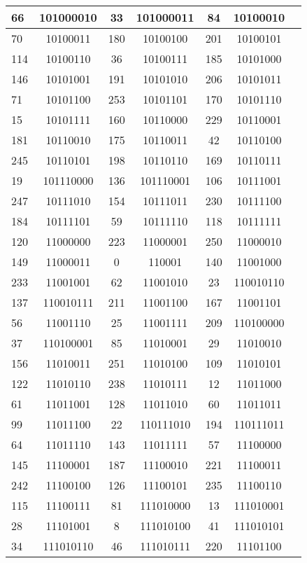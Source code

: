 \documentclass[conference,onecolumn,12pt]{IEEEtran}
\numberwithin{equation}{subsection}
\begin{document}
\begin{table}[h]
\begin{tabular}{lcccccc}
66 & 101000010 & 33 & 101000011 & 84 & 10100010 \\ \hline
70 & 10100011 & 180 & 10100100 & 201 & 10100101 \\ \hline
114 & 10100110 & 36 & 10100111 & 185 & 10101000 \\ \hline
146 & 10101001 & 191 & 10101010 & 206 & 10101011 \\ \hline
71 & 10101100 & 253 & 10101101 & 170 & 10101110 \\ \hline
15 & 10101111 & 160 & 10110000 & 229 & 10110001 \\ \hline
181 & 10110010 & 175 & 10110011 & 42 & 10110100 \\ \hline
245 & 10110101 & 198 & 10110110 & 169 & 10110111 \\ \hline
19 & 101110000 & 136 & 101110001 & 106 & 10111001 \\ \hline
247 & 10111010 & 154 & 10111011 & 230 & 10111100 \\ \hline
184 & 10111101 & 59 & 10111110 & 118 & 10111111 \\ \hline
120 & 11000000 & 223 & 11000001 & 250 & 11000010 \\ \hline
149 & 11000011 & 0 & 110001 & 140 & 11001000 \\ \hline
233 & 11001001 & 62 & 11001010 & 23 & 110010110 \\ \hline
137 & 110010111 & 211 & 11001100 & 167 & 11001101 \\ \hline
56 & 11001110 & 25 & 11001111 & 209 & 110100000 \\ \hline
37 & 110100001 & 85 & 11010001 & 29 & 11010010 \\ \hline
156 & 11010011 & 251 & 11010100 & 109 & 11010101 \\ \hline
122 & 11010110 & 238 & 11010111 & 12 & 11011000 \\ \hline
61 & 11011001 & 128 & 11011010 & 60 & 11011011 \\ \hline
99 & 11011100 & 22 & 110111010 & 194 & 110111011 \\ \hline
64 & 11011110 & 143 & 11011111 & 57 & 11100000 \\ \hline
145 & 11100001 & 187 & 11100010 & 221 & 11100011 \\ \hline
242 & 11100100 & 126 & 11100101 & 235 & 11100110 \\ \hline
115 & 11100111 & 81 & 111010000 & 13 & 111010001 \\ \hline
28 & 11101001 & 8 & 111010100 & 41 & 111010101 \\ \hline
34 & 111010110 & 46 & 111010111 & 220 & 11101100 \\ \hline

\end{tabular}
\end{table}
\end{document}
